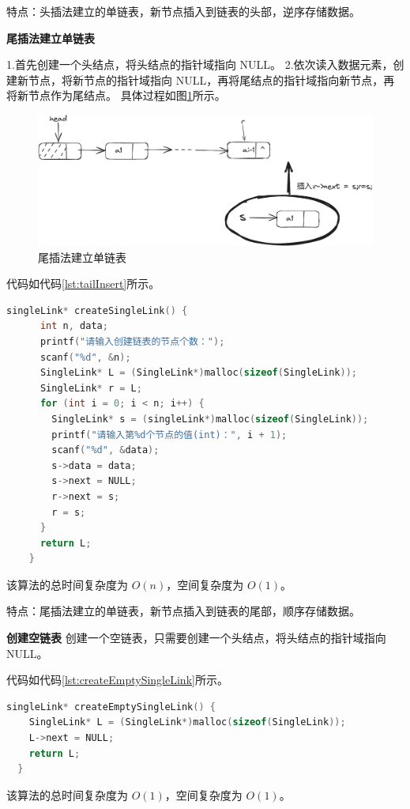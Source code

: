 \documentclass[lang=cn,newtx,10pt,scheme=chinese]{../elegantbook}
\begin{document}
    特点：头插法建立的单链表，新节点插入到链表的头部，逆序存储数据。

  \textbf{尾插法建立单链表}

  1.首先创建一个头结点，将头结点的指针域指向 NULL。
  2.依次读入数据元素，创建新节点，将新节点的指针域指向 NULL，再将尾结点的指针域指向新节点，再将新节点作为尾结点。
  具体过程如图\ref{fig:tailInsert}所示。
  \begin{figure}[!htbp]
    \centering
    \includegraphics[width=1\textwidth]{./figure/pdf/cropped/tailInsert.pdf}
    \caption{尾插法建立单链表}
    \label{fig:tailInsert}
  \end{figure}
  代码如代码\ref{lst:tailInsert}所示。
  \begin{lstlisting}[language=C++, caption={尾插法建立单链表示例代码}, label={lst:tailInsert}]
    singleLink* createSingleLink() {
      int n, data;
      printf("请输入创建链表的节点个数：");
      scanf("%d", &n);
      SingleLink* L = (SingleLink*)malloc(sizeof(SingleLink));
      SingleLink* r = L;
      for (int i = 0; i < n; i++) {
        SingleLink* s = (singleLink*)malloc(sizeof(SingleLink));
        printf("请输入第%d个节点的值(int)：", i + 1);
        scanf("%d", &data);
        s->data = data;
        s->next = NULL;
        r->next = s;
        r = s;
      }
      return L;
    }
    \end{lstlisting}
    该算法的总时间复杂度为 $O(n)$，空间复杂度为 $O(1)$。

    特点：尾插法建立的单链表，新节点插入到链表的尾部，顺序存储数据。

    \textbf{创建空链表}
创建一个空链表，只需要创建一个头结点，将头结点的指针域指向 NULL。

代码如代码\ref{lst:createEmptySingleLink}所示。
\begin{lstlisting}[language=C++, caption={创建一个空链表示例代码}, label={lst:createEmptySingleLink}]
  singleLink* createEmptySingleLink() {
    SingleLink* L = (SingleLink*)malloc(sizeof(SingleLink));
    L->next = NULL;
    return L;
  }
\end{lstlisting}
该算法的总时间复杂度为 $O(1)$，空间复杂度为 $O(1)$。
\end{document}
